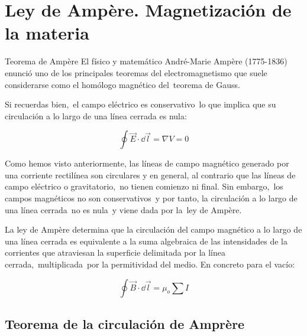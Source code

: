 \chapter{Ley de Ampère. Magnetización de la materia}


\begin{miparrafo}
Teorema de Ampère
El físico y matemático André-Marie Ampère (1775-1836) enunció uno de los principales teoremas del electromagnetismo que suele considerarse como el homólogo magnético del teorema de Gauss.

Si recuerdas bien, el campo eléctrico es conservativo lo que implica que su circulación a lo largo de una línea cerrada es nula:

$$ \oint \vec E \cdot \dd \vec l = \nabla V =0$$

Como hemos visto anteriormente, las líneas de campo magnético generado por una corriente rectilínea son circulares y en general, al contrario que las líneas de campo eléctrico o gravitatorio, no tienen comienzo ni final. Sin embargo, los campos magnéticos no son conservativos y por tanto, la circulación a lo largo de una línea cerrada no es nula y viene dada por la ley de Ampère.

La ley de Ampère determina que la circulación del campo magnético a lo largo de una línea cerrada es equivalente a la suma algebraica de las intensidades de la corrientes que atraviesan la superficie delimitada por la línea cerrada, multiplicada por la permitividad del medio. En concreto para el vacío:

$$ \oint \vec B \cdot \dd \vec l = \mu_o \sum I$$
\vspace{10mm} %
\rightline{\textcolor{gris}{`https://www.fisicalab.com/apartado/ley-de-ampere'}}
\end{miparrafo}

\vspace{30mm} %

\section{Teorema de la circulación de Amprère}

